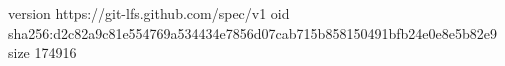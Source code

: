 version https://git-lfs.github.com/spec/v1
oid sha256:d2c82a9c81e554769a534434e7856d07cab715b858150491bfb24e0e8e5b82e9
size 174916

